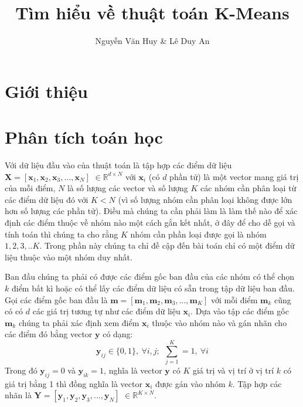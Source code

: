 \documentclass{article}
\title{Tìm hiểu về thuật toán K-Means}
\author{Nguyễn Văn Huy \& Lê Duy An}
\begin{document}
	\maketitle{} 
	\newpage
	\tableofcontents
	\newpage
	
	\section{Giới thiệu} %
	\label{sec:giới_thiệu}
	
	\section{Phân tích toán học} %
	\label{sec:phân_tích_toán_học}
	Với dữ liệu đầu vào của thuật toán là tập hợp các điểm dữ liệu $\mathbf{X} = [\mathbf{x}_1,\mathbf{x}_2,\mathbf{x}_3,...,\mathbf{x}_N]$ $\in \mathds{R}^{d\times N}$ với $\mathbf{x}_i$ (có $d$ phần tử) là một vector mang giá trị của mỗi điểm, $N$ là số lượng các vector và số lượng $K$ các nhóm cần phân loại từ các điểm dữ liệu đó với $K < N$ (vì số lượng nhóm cần phân loại không được lớn hơn số lượng các phần tử). Điều mà chúng ta cần phải làm là làm thế nào để xác định các điểm thuộc về nhóm nào một cách gắn kết nhất, ở đây để cho dễ gọi và tính toán thì chúng ta cho rằng $K$ nhóm cần phần loại được gọi là nhóm $1,2,3,..K$. Trong phần này chúng ta chỉ đề cập đến bài toán chỉ có một điểm dữ liệu thuộc vào một nhóm duy nhất.\par
	Ban đầu chúng ta phải có được các điểm gốc ban đầu của các nhóm có thể chọn $k$ điểm bất kì hoặc có thể lấy các điểm dữ liệu có sẵn trong tập dữ liệu ban đầu. Gọi các điểm gốc ban đầu là $\mathbf{m} = [\mathbf{m}_1,\mathbf{m}_2,\mathbf{m}_3,...,\mathbf{m}_K]$ với mỗi điểm $\mathbf{m}_k$ cũng có có $d$ các giá trị tương tự như các điểm dữ liệu $\mathbf{x}_i$. Dựa vào tập các điểm gốc $\mathbf{m}_k$ chúng ta phải xác định xem điểm $\mathbf{x}_i$ thuộc vào nhóm nào và gán nhãn cho các điểm đó bằng vector $\mathbf{y}$ có dạng:
	$$\mathbf{y}_{ij} \in \{0,1\},\ \forall i,j;\ \  \sum_{j = 1}^{K} = 1,\  \forall i$$
	Trong đó $\mathbf{y}_{ij} = 0$ và $\mathbf{y}_{ik} = 1$, nghĩa là vector $\mathbf{y}$ có $K$ giá trị và vị trí ở vị trí $k$ có giá trị bằng 1 thì đồng nghĩa là vector $\mathbf{x}_i$ được gán vào nhóm $k$. Tập hợp các nhãn là $\mathbf{Y} = [\mathbf{y}_1,\mathbf{y}_2,\mathbf{y}_3,...,\mathbf{y}_N]$ $\in \mathds{R}^{K\times N}$.\par
\end{document}
